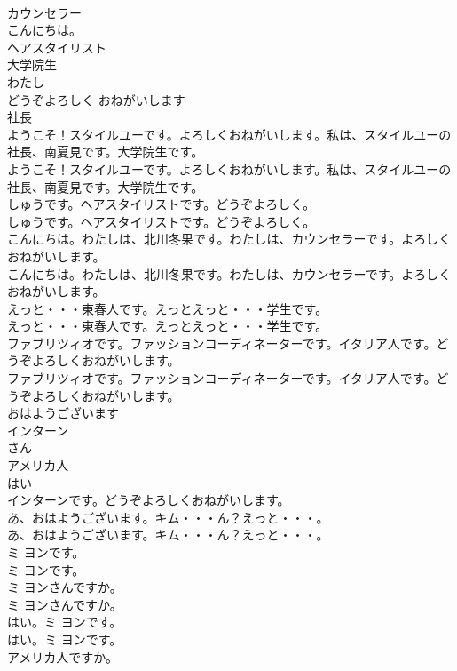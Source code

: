 \documentclass[8pt]{extreport}
\begin{document}
\begin{CJK}{UTF8}{min}
\\	カウンセラー
\\	こんにちは。
\\	ヘアスタイリスト
\\	大学院生
\\	わたし
\\	どうぞよろしく おねがいします
\\	社長
\\	ようこそ！スタイルユーです。よろしくおねがいします。私は、スタイルユーの社長、南夏見です。大学院生です。	
\\	ようこそ！スタイルユーです。よろしくおねがいします。私は、スタイルユーの社長、南夏見です。大学院生です。 
\\	しゅうです。ヘアスタイリストです。どうぞよろしく。	
\\	しゅうです。ヘアスタイリストです。どうぞよろしく。 
\\	こんにちは。わたしは、北川冬果です。わたしは、カウンセラーです。よろしくおねがいします。	
\\	こんにちは。わたしは、北川冬果です。わたしは、カウンセラーです。よろしくおねがいします。 
\\	えっと・・・東春人です。えっとえっと・・・学生です。	
\\	えっと・・・東春人です。えっとえっと・・・学生です。 
\\	ファブリツィオです。ファッションコーディネーターです。イタリア人です。どうぞよろしくおねがいします。	
\\	ファブリツィオです。ファッションコーディネーターです。イタリア人です。どうぞよろしくおねがいします。 
\\	おはようございます
\\	インターン
\\	さん
\\	アメリカ人
\\	はい
\\	インターンです。どうぞよろしくおねがいします。	
\\	あ、おはようございます。キム・・・ん？えっと・・・。	
\\	あ、おはようございます。キム・・・ん？えっと・・・。 
\\	ミ ヨンです。	
\\	ミ ヨンです。 
\\	ミ ヨンさんですか。	
\\	ミ ヨンさんですか。 
\\	はい。ミ ヨンです。	
\\	はい。ミ ヨンです。 
\\	アメリカ人ですか。	

\end{CJK}
\end{document}
